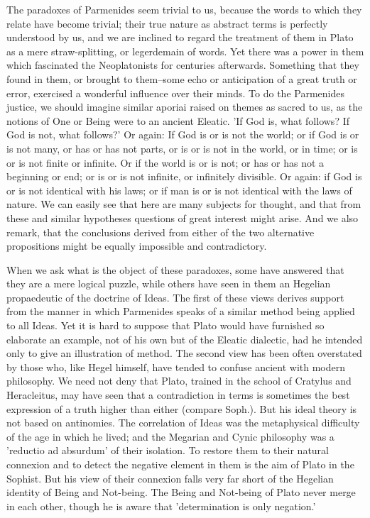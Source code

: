 The paradoxes of Parmenides seem trivial to us, because the words to
which they relate have become trivial; their true nature as abstract
terms is perfectly understood by us, and we are inclined to regard the
treatment of them in Plato as a mere straw-splitting, or legerdemain of
words. Yet there was a power in them which fascinated the Neoplatonists
for centuries afterwards. Something that they found in them, or brought
to them--some echo or anticipation of a great truth or error, exercised
a wonderful influence over their minds. To do the Parmenides justice, we
should imagine similar aporiai raised on themes as sacred to us, as the
notions of One or Being were to an ancient Eleatic. 'If God is, what
follows? If God is not, what follows?' Or again: If God is or is not the
world; or if God is or is not many, or has or has not parts, or is or is
not in the world, or in time; or is or is not finite or infinite. Or if
the world is or is not; or has or has not a beginning or end; or is or
is not infinite, or infinitely divisible. Or again: if God is or is not
identical with his laws; or if man is or is not identical with the laws
of nature. We can easily see that here are many subjects for thought,
and that from these and similar hypotheses questions of great interest
might arise. And we also remark, that the conclusions derived from
either of the two alternative propositions might be equally impossible
and contradictory.

When we ask what is the object of these paradoxes, some have answered
that they are a mere logical puzzle, while others have seen in them an
Hegelian propaedeutic of the doctrine of Ideas. The first of these views
derives support from the manner in which Parmenides speaks of a similar
method being applied to all Ideas. Yet it is hard to suppose that Plato
would have furnished so elaborate an example, not of his own but of
the Eleatic dialectic, had he intended only to give an illustration of
method. The second view has been often overstated by those who, like
Hegel himself, have tended to confuse ancient with modern philosophy.
We need not deny that Plato, trained in the school of Cratylus and
Heracleitus, may have seen that a contradiction in terms is sometimes
the best expression of a truth higher than either (compare Soph.). But
his ideal theory is not based on antinomies. The correlation of Ideas
was the metaphysical difficulty of the age in which he lived; and the
Megarian and Cynic philosophy was a 'reductio ad absurdum' of their
isolation. To restore them to their natural connexion and to detect the
negative element in them is the aim of Plato in the Sophist. But his
view of their connexion falls very far short of the Hegelian identity
of Being and Not-being. The Being and Not-being of Plato never merge in
each other, though he is aware that 'determination is only negation.'

